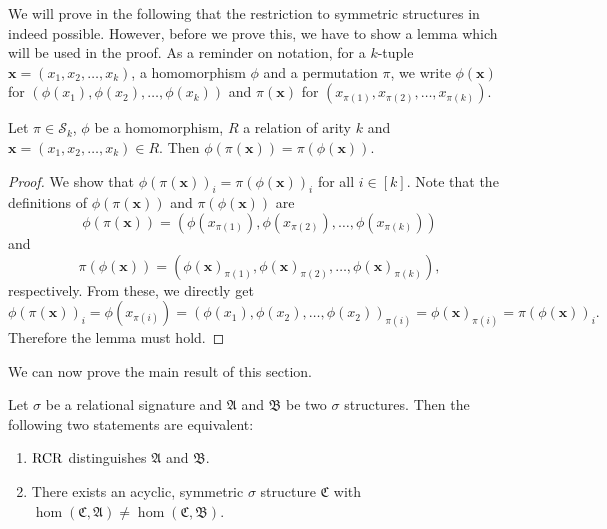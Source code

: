 We will prove in the following that the restriction to symmetric structures in indeed possible.
However, before we prove this, we have to show a lemma which will be used in the proof.
As a reminder on notation, for a $k$-tuple $\mathbf x=(x_1,x_2,\dots,x_k)$, a homomorphism $\phi$ and a permutation $\pi$, we write $\phi(\mathbf x)$ for $(\phi(x_1),\phi(x_2),\dots,\phi(x_k))$ and $\pi(\mathbf x)$ for $(x_{\pi(1)},x_{\pi(2)},\dots,x_{\pi(k)})$.
\begin{lemma}
	Let $\pi\in\mathcal S_k$, $\phi$ be a homomorphism, $R$ a relation of arity $k$ and $\mathbf x=(x_1,x_2,\dots,x_k)\in R$.
	Then $\phi(\pi(\mathbf x))=\pi(\phi(\mathbf x))$.
	\label{HomAndPermutCommute}
\end{lemma}
\begin{proof}
	We show that $\phi(\pi(\mathbf x))_i=\pi(\phi(\mathbf x))_i$ for all $i\in [k]$.
	Note that the definitions of $\phi(\pi(\mathbf x))$ and $\pi(\phi(\mathbf x))$ are 
	$$\phi(\pi(\mathbf x)) = (\phi(x_{\pi(1)}), \phi(x_{\pi(2)}),\dots,\phi(x_{\pi(k)}))$$
	and
	$$\pi(\phi(\mathbf x)) = (\phi(\mathbf x)_{\pi(1)},\phi(\mathbf x)_{\pi(2)},\dots,\phi(\mathbf x)_{\pi(k)}),$$
	respectively.
	From these, we directly get
	$$\phi(\pi(\mathbf x))_i=\phi(x_{\pi(i)})=(\phi(x_1),\phi(x_2),\dots,\phi(x_2))_{\pi(i)}=\phi(\mathbf x)_{\pi(i)}=\pi(\phi(\mathbf x))_i.$$
	Therefore the lemma must hold.
\end{proof}
We can now prove the main result of this section.
\begin{theorem}
	\label{thm:ThmD}
	Let $\sigma$ be a relational signature and $\mathfrak A$ and $\mathfrak B$ be two $\sigma$ structures.
	Then the following two statements are equivalent:
	\begin{enumerate}
		\item $\operatorname{RCR}$ distinguishes $\mathfrak A$ and $\mathfrak B$.
		\item There exists an acyclic, symmetric $\sigma$ structure $\mathfrak C$ with $\hom(\mathfrak C,\mathfrak A)\neq \hom(\mathfrak C,\mathfrak B)$.
	\end{enumerate}
\end{theorem}
